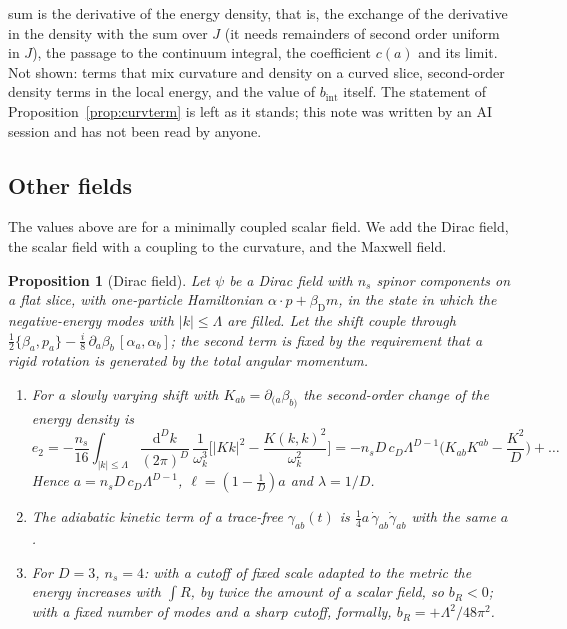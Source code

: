\documentclass[11pt,a4paper]{article}
\theoremstyle{stmt}
\newtheorem{proposition}[theorem]{Proposition}
\theoremstyle{defn}
\theoremstyle{rmk}
\numberwithin{equation}{section}
\newcommand{\dd}{\mathrm{d}}
\begin{document}
sum is the derivative of the energy density, that is, the exchange of the derivative in the density with the sum over $J$ (it needs remainders of second order uniform in $J$), the passage to the continuum integral, the coefficient $c(a)$ and its limit. Not shown: terms that mix curvature and density on a curved slice, second-order density terms in the local energy, and the value of $b_{\mathrm{int}}$ itself. The statement of Proposition~\ref{prop:curvterm} is left as it stands; this note was written by an AI session and has not been read by anyone.

\subsection{Other fields}\label{sec:fields}

The values above are for a minimally coupled scalar field. We add the Dirac field, the scalar field with a coupling to the curvature, and the Maxwell field.

\begin{proposition}[Dirac field]\label{prop:dirac}
Let $\psi$ be a Dirac field with $n_s$ spinor components on a flat slice, with one-particle Hamiltonian $\alpha\cdot p+\beta_{\mathrm D}m$, in the state in which the negative-energy modes with $|k|\le\Lambda$ are filled. Let the shift couple through $\tfrac12\{\beta_a,p_a\}-\tfrac i8\,\partial_a\beta_b\,[\alpha_a,\alpha_b]$; the second term is fixed by the requirement that a rigid rotation is generated by the total angular momentum.
\begin{enumerate}[label=\textup{(\roman*)}]
\item For a slowly varying shift with $K_{ab}=\partial_{(a}\beta_{b)}$ the second-order change of the energy density is
\begin{equation}\label{eq:e2dirac}
e_2=-\frac{n_s}{16}\int_{|k|\le\Lambda}\frac{\dd^Dk}{(2\pi)^D}\,\frac{1}{\omega_k^3}\Big[|Kk|^2-\frac{K(k,k)^2}{\omega_k^2}\Big]
=-n_sD\,c_D\Lambda^{D-1}\Big(K_{ab}K^{ab}-\frac{K^2}{D}\Big)+\dots
\end{equation}
Hence $a=n_sD\,c_D\Lambda^{D-1}$, $\ell=(1-\tfrac1D)a$ and $\lambda=1/D$.
\item The adiabatic kinetic term of a trace-free $\gamma_{ab}(t)$ is $\tfrac14a\,\dot\gamma_{ab}\dot\gamma_{ab}$ with the same $a$.
\item For $D=3$, $n_s=4$: with a cutoff of fixed scale adapted to the metric the energy increases with $\int R$, by twice the amount of a scalar field, so $b_R<0$; with a fixed number of modes and a sharp cutoff, formally, $b_R=+\Lambda^2/48\pi^2$.
\end{enumerate}
\end{proposition}
\end{document}
